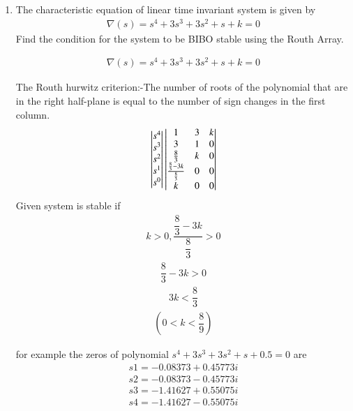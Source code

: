 \begin{enumerate}[label=\thesubsection.\arabic*.,ref=\thesubsection.\theenumi]
\item 
The characteristic equation of linear time invariant system is given by
\begin{align} 
\nabla(s)=s^4+3s^3+3s^2+s+k=0
\end{align}
Find the condition for the system to be BIBO stable using the Routh Array.

\solution
\begin{align}
\nabla(s)=s^4+3s^3+3s^2+s+k=0
\end{align}

The Routh hurwitz criterion:-The number of roots of the polynomial that are in the right half-plane is equal to the number of sign changes in the first column.
\bigskip
\begin{align}
\begin{vmatrix}s^4\\s^3\\s^2\\s^1 \\ s^0\end{vmatrix}
\begin{vmatrix}1 & 3 & k \\ 3 & 1 & 0\\  \frac{8}{3}& k & 0\\ \frac{\frac{8}{3}-3k}{\frac{8}{3}} & 0 & 0\\k & 0 & 0\end{vmatrix} 
\end{align}
Given system is stable if
\begin{align}
k>0 ,  \dfrac{\dfrac{8}{3}-3k}{\dfrac{8}{3}}>0    
\end{align}
\begin{align}
{\dfrac{8}{3}-3k} >0
\end{align}
\begin{align}
3k<\dfrac{8}{3}
\end{align}
\begin{align}
(0<k<\dfrac{8}{9})
\end{align}

for example the zeros of polynomial $s^4+3s^3+3s^2+s+0.5=0$ are 
\begin{align}
s1=-0.08373+0.45773i
\end{align}
\begin{align}
s2=-0.08373-0.45773i
\end{align}
\begin{align}
s3=-1.41627+0.55075i
\end{align}
\begin{align}
s4=-1.41627-0.55075i
\end{align}


\end{enumerate}
